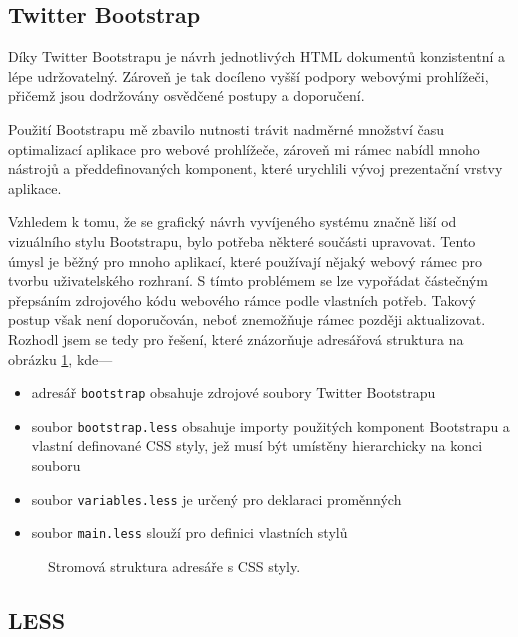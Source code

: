 \subsection{Twitter Bootstrap}

Díky Twitter Bootstrapu je návrh jednotlivých HTML dokumentů konzistentní a lépe udržovatelný. Zároveň je tak docíleno vyšší podpory webovými prohlížeči, přičemž jsou dodržovány osvědčené postupy a doporučení.

Použití Bootstrapu mě zbavilo nutnosti trávit nadměrné množství času optimalizací aplikace pro webové prohlížeče, zároveň mi rámec nabídl mnoho nástrojů a předdefinovaných komponent, které urychlili vývoj prezentační vrstvy aplikace.

Vzhledem k tomu, že se grafický návrh vyvíjeného systému značně liší od vizuálního stylu Bootstrapu, bylo potřeba některé součásti upravovat. Tento úmysl je běžný pro mnoho aplikací, které používají nějaký webový rámec pro tvorbu uživatelského rozhraní. S tímto problémem se lze vypořádat částečným přepsáním zdrojového kódu webového rámce podle vlastních potřeb. Takový postup však není doporučován, neboť znemožňuje rámec později aktualizovat. Rozhodl jsem se tedy pro řešení, které znázorňuje adresářová struktura na obrázku \ref{fig:tree}, kde---

\begin{itemize}
    \item adresář \texttt{bootstrap} obsahuje zdrojové soubory Twitter Bootstrapu
    \item soubor \texttt{bootstrap.less} obsahuje importy použitých komponent Bootstrapu a vlastní definované CSS styly, jež musí být umístěny hierarchicky na konci souboru
    \item soubor \texttt{variables.less} je určený pro deklaraci proměnných
    \item soubor \texttt{main.less} slouží pro definici vlastních stylů
\end{itemize}


\begin{figure}
    \caption{Stromová struktura adresáře s CSS styly.}
    \label{fig:tree}
\end{figure}

\subsection{LESS}

